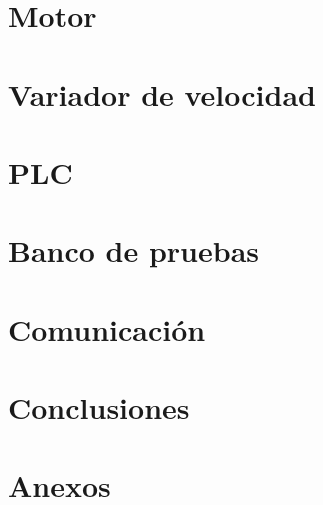 \documentclass[12pt,a4paper]{article}
\begin{document}
\section{Motor}


\section{Variador de velocidad}

	
\section{PLC}

	
\section{Banco de pruebas}


\section{Comunicación}


\section{Conclusiones}


\section{Anexos}

\end{document}
